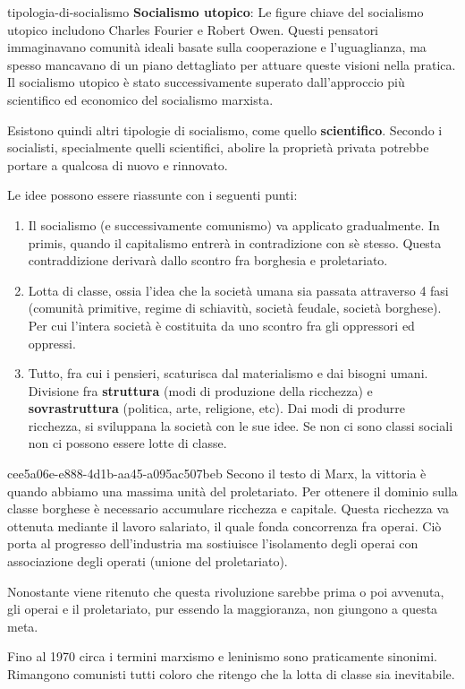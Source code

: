 \documentclass[preview]{standalone}
\begin{document}
\begin{snippet}{tipologia-di-socialismo}
    \textbf{Socialismo utopico}: Le figure chiave del socialismo utopico includono Charles Fourier e Robert Owen.
    Questi pensatori immaginavano comunità ideali basate sulla cooperazione e l'uguaglianza,
    ma spesso mancavano di un piano dettagliato per attuare queste visioni nella pratica.
    Il socialismo utopico è stato successivamente superato dall'approccio più scientifico
    ed economico del socialismo marxista.

    Esistono quindi altri tipologie di socialismo, come quello \textbf{scientifico}.
    Secondo i socialisti, specialmente quelli scientifici, abolire la proprietà privata
    potrebbe portare a qualcosa di nuovo e rinnovato.

    Le idee possono essere riassunte con i seguenti punti:
    \begin{enumerate}
        \item Il socialismo (e successivamente comunismo) va applicato gradualmente. In primis, quando il capitalismo entrerà in contradizione con sè stesso.
        Questa contraddizione derivarà dallo scontro fra borghesia e proletariato.
        \item Lotta di classe, ossia l'idea che la società umana sia passata attraverso 4 fasi
        (comunità primitive, regime di schiavitù, società feudale, società borghese).
        Per cui l'intera società è costituita da uno scontro fra gli oppressori ed oppressi.
        \item Tutto, fra cui i pensieri, scaturisca dal materialismo e dai bisogni umani.
        Divisione fra \textbf{struttura} (modi di produzione della ricchezza)
        e \textbf{sovrastruttura} (politica, arte, religione, etc).
        Dai modi di produrre ricchezza, si sviluppana la società con le sue idee.
        Se non ci sono classi sociali non ci possono essere lotte di classe.
    \end{enumerate}
\end{snippet}


\begin{snippet}{cee5a06e-e888-4d1b-aa45-a095ac507beb}
    Secono il testo di Marx, la vittoria è quando abbiamo una massima unità del proletariato.
    Per ottenere il dominio sulla classe borghese è necessario accumulare ricchezza e capitale.
    Questa ricchezza va ottenuta mediante il lavoro salariato, il quale fonda concorrenza fra operai.
    Ciò porta al progresso dell'industria ma sostiuisce l'isolamento degli operai con associazione degli operati (unione del proletariato).

    Nonostante viene ritenuto che questa rivoluzione sarebbe prima o poi avvenuta, gli operai e il proletariato,
    pur essendo la maggioranza, non giungono a questa meta.

    Fino al 1970 circa i termini marxismo e leninismo sono praticamente sinonimi.
    Rimangono comunisti tutti coloro che ritengo che la lotta di classe sia inevitabile.
\end{snippet}
\end{document}
